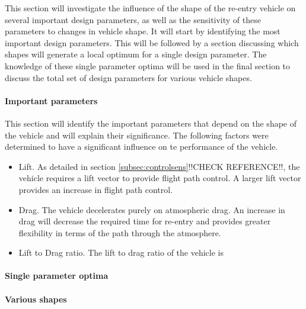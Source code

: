 This section will investigate the influence of the shape of the re-entry vehicle on several important design parameters, as well as the sensitivity of these parameters to changes in vehicle shape. It will start by identifying the most important design parameters. This will be followed by a section discussing which shapes will generate a local optimum for a single design parameter. The knowledge of these single parameter optima will be used in the final section to discuss the total set of design parameters for various vehicle shapes. 

\paragraph{Important parameters}
This section will identify the important parameters that depend on the shape of the vehicle and will explain their significance. The following factors were determined to have a significant influence on te performance of the vehicle.

\begin{itemize}
	\item{Lift. As detailed in section \ref{subsec:controlsens}!!CHECK REFERENCE!!, the vehicle requires a lift vector to provide flight path control. A larger lift vector provides an increase in flight path control.}
	\item{Drag. The vehicle decelerates purely on atmospheric drag. An increase in drag will decrease the required time for re-entry and provides greater flexibility in terms of the path through the atmosphere. }
	\item{Lift to Drag ratio. The lift to drag ratio of the vehicle is}
\end{itemize}

\paragraph{Single parameter optima}


\paragraph{Various shapes}

